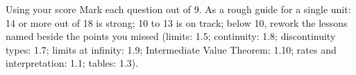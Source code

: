 \documentclass[11pt]{article}
\begin{document}
\begin{scorebox}{Using your score}
Mark each question out of 9. As a rough guide for a single unit: 14 or more out of 18 is strong; 10 to 13 is on track; below 10, rework the lessons named beside the points you missed (limits: 1.5; continuity: 1.8; discontinuity types: 1.7; limits at infinity: 1.9; Intermediate Value Theorem: 1.10; rates and interpretation: 1.1; tables: 1.3).
\end{scorebox}
\end{document}

